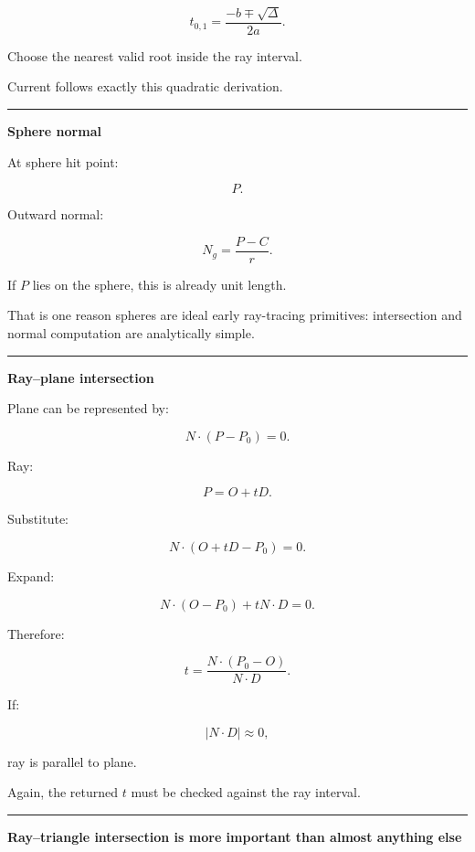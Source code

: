\[
\boxed{
t_{0,1}
=
\frac{-b\mp\sqrt{\Delta}}{2a}.
}
\]

Choose the nearest valid root inside the ray interval.

Current  follows exactly this quadratic derivation.

\begin{center}\rule{0.5\linewidth}{0.5pt}\end{center}

\textbf{Sphere normal}

At sphere hit point:

\[
P.
\]

Outward normal:

\[
\boxed{
N_g=
\frac{P-C}{r}.
}
\]

If \(P\) lies on the sphere, this is already unit length.

That is one reason spheres are ideal early ray-tracing primitives: intersection and normal computation are analytically simple.

\begin{center}\rule{0.5\linewidth}{0.5pt}\end{center}

\textbf{Ray--plane intersection}

Plane can be represented by:

\[
N\cdot(P-P_0)=0.
\]

Ray:

\[
P=O+tD.
\]

Substitute:

\[
N\cdot(O+tD-P_0)=0.
\]

Expand:

\[
N\cdot(O-P_0)+tN\cdot D=0.
\]

Therefore:

\[
\boxed{
t=
\frac{
N\cdot(P_0-O)
}{
N\cdot D
}.
}
\]

If:

\[
|N\cdot D|\approx0,
\]

ray is parallel to plane.

Again, the returned \(t\) must be checked against the ray interval.

\begin{center}\rule{0.5\linewidth}{0.5pt}\end{center}

\textbf{Ray--triangle intersection is more important than almost anything else}

